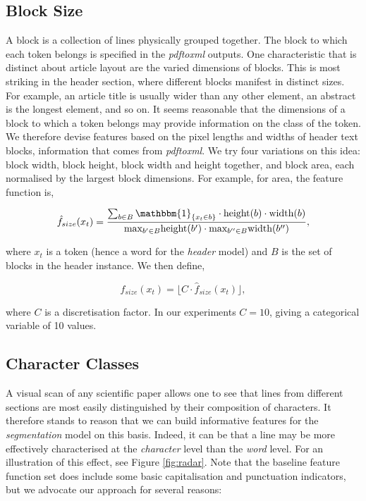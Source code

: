 \subsection{Block Size}

A block is a collection of lines physically grouped together. The block to which each token belongs is specified in the \emph{pdftoxml} outputs. One characteristic that is distinct about article layout are the varied dimensions of blocks. This is most striking in the header section, where different blocks manifest in distinct sizes. For example, an article title is usually wider than any other element, an abstract is the longest element, and so on. It seems reasonable that the dimensions of a block to which a token belongs may provide information on the class of the token. We therefore devise features based on the pixel lengths and widths of header text blocks, information that comes from \emph{pdftoxml}. We try four variations on this idea: block width, block height, block width and height together, and block area, each normalised by the largest block dimensions. For example, for area, the feature function is,

\begin{equation}
\hat f_{size}(x_t) = \frac{\sum_{b \in B} \mathbbm{1}_{\{x_t \in b\}} \cdot\text{height}(b)\cdot\text{width}(b)}{\text{max}_{b' \in B} \text{height}(b') \cdot \text{max}_{b'' \in B} \text{width}(b'')},
\label{eq:areafunction}
\end{equation}

where $x_t$ is a token (hence a word for the \emph{header} model) and $B$ is the set of blocks in the header instance. We then define,

\begin{equation}
f_{size}(x_t) = \big\lfloor C \cdot\hat f_{size}(x_t)\big\rfloor,
\label{eq:areafunctiondisc}
\end{equation}

where $C$ is a discretisation factor. In our experiments $C = 10$, giving a categorical variable of 10 values.

\subsection{Character Classes}
\label{subsec:characterclasses}
A visual scan of any scientific paper allows one to see that lines from different sections are most easily distinguished by their composition of characters. It therefore stands to reason that we can build informative features for the \emph{segmentation} model on this basis. Indeed, it can be that a line may be more effectively characterised at the \emph{character} level than the \emph{word} level. For an illustration of this effect, see Figure \ref{fig:radar}. Note that the baseline feature function set does include some basic capitalisation and punctuation indicators, but we advocate our approach for several reasons:

